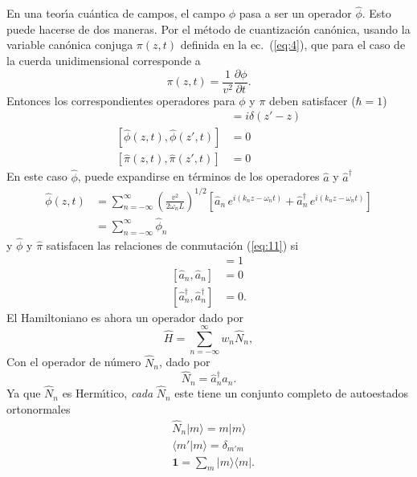 En una teor\'\i a cu\'antica de campos, el campo $\phi$ pasa a ser un operador
$\hat{\phi}$. Esto puede hacerse de dos maneras. Por el m\'etodo de
cuantizaci\'on can\'onica, usando la variable can\'onica conjuga $\pi(z,t)$
definida en la ec.~(\ref{eq:4}), que para el caso de la cuerda
unidimensional corresponde a
\begin{equation}
  \pi(z,t)=\frac{1}{v^2}\frac{\partial\phi}{\partial t}.
\end{equation}
Entonces los correspondientes operadores para $\phi$ y $\pi$ deben
satisfacer ($\hbar=1$)
\begin{align}
  [\hat{\phi}(z,t),\hat{\pi}(z',t)]&=i\delta(z'-z)\nonumber\\
  \label{eq:11}
  [\hat{\phi}(z,t),\hat{\phi}(z',t)]&=0\\
  [\hat{\pi}(z,t),\hat{\pi}(z',t)]&=0\nonumber
\end{align}
En este caso $\hat{\phi}$, puede expandirse en t\'erminos de los operadores
$\hat a$ y $\hat{a}^\dagger$
\begin{align}
  \label{eq:12}
  \hat{\phi}(z,t)&=\sum_{n=-\infty}^\infty
  \left(
    \frac{v^2}{2\omega_nL}
  \right)^{1/2}
  \left[
    \hat{a}_n\,e^{i(k_nz-\omega_n t)}+\hat{a}^\dagger_n\,e^{i(k_nz-\omega_n t)}
  \right]\nonumber\\
&=\sum_{n=-\infty}^\infty\hat{\phi}_n
\end{align}
y $\hat{\phi}$ y $\hat{\pi}$ satisfacen las relaciones de conmutaci\'on
(\ref{eq:11}) si
\begin{align}
  [\hat{a}_n,\hat{a}^\dagger_n]&=1\nonumber\\
  [\hat a_n,\hat a_n]&=0\nonumber\\
  [\hat{a}^\dagger_n,\hat{a}^\dagger_n]&=0.
\end{align}
El Hamiltoniano es ahora un operador dado por
\begin{equation}
  \widehat{H}=\sum_{n=-\infty}^\infty w_n\widehat{N}_n,
\end{equation}
Con el operador de n\'umero $\widehat{N}_n$, dado por
\begin{equation}
  \widehat{N}_n=\hat{a}^\dagger_na_n.
\end{equation}
Ya que $\widehat{N}_n$ es Herm\'\i tico, \emph{cada} $\widehat{N}_n$ este tiene un conjunto completo de autoestados ortonormales \cite{ultimo}
\begin{align}
  &\widehat{N}_n|m\rangle=m|m\rangle\nonumber\\
  &\langle m'|m\rangle=\delta_{m' m}\nonumber\\
  &\mathbf{1}=\sum_m|m\rangle\langle m|.
\end{align}
